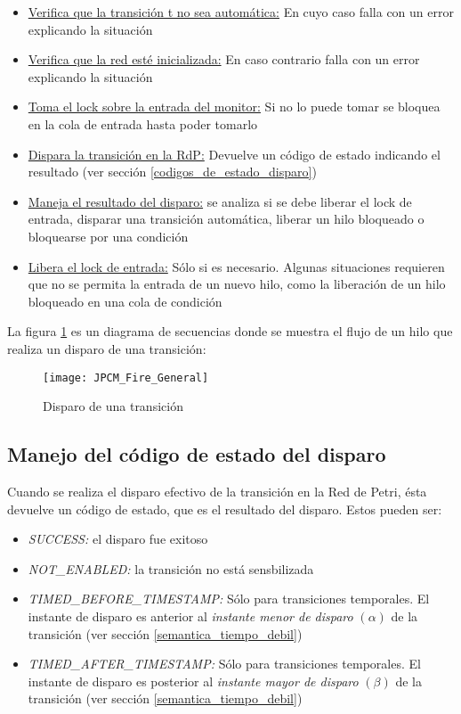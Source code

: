\begin{itemize}
  \item \underline{Verifica que la transición t no sea automática:} En cuyo caso
  falla con un error explicando la situación
  \item \underline{Verifica que la red esté inicializada:} En caso contrario
  falla con un error explicando la situación
  \item \underline{Toma el lock sobre la entrada del monitor:} Si no lo puede
  tomar se bloquea en la cola de entrada hasta poder tomarlo
  \item  \underline{Dispara la transición en la RdP:} Devuelve un código de
  estado indicando el resultado (ver sección \ref{codigos_de_estado_disparo})
  \item \underline{Maneja el resultado del disparo:} se analiza si se debe
  liberar el lock de entrada, disparar una transición automática, liberar un
  hilo bloqueado o bloquearse por una condición
  \item \underline{Libera el lock de entrada:} Sólo si es necesario. Algunas
  situaciones requieren que no se permita la entrada de un nuevo hilo, como la
  liberación de un hilo bloqueado en una cola de condición
\end{itemize}
 
La figura \ref{fig:JPCM_Fire_General} es un diagrama de secuencias donde se
muestra el flujo de un hilo que realiza un disparo de una transición:

\begin{figure}[H]
  \texttt{[image: JPCM\_Fire\_General]}
  \caption{Disparo de una transición}
  \label{fig:JPCM_Fire_General}
\end{figure}

\subsection*{Manejo del código de estado del disparo}
\label{codigos_de_estado_disparo}

Cuando se realiza el disparo efectivo de la transición en la Red de Petri, ésta
devuelve un código de estado, que es el resultado del disparo. Estos pueden
ser:
\begin{itemize}
  \item \textit{SUCCESS:} el disparo fue exitoso
  \item \textit{NOT\_ENABLED:} la transición no está sensbilizada
  \item \textit{TIMED\_BEFORE\_TIMESTAMP:} Sólo para transiciones
  temporales. El instante de disparo es anterior al \textit{instante menor de
  disparo} $(\alpha)$ de la transición (ver sección \ref{semantica_tiempo_debil})
  \item \textit{TIMED\_AFTER\_TIMESTAMP:} Sólo para transiciones
  temporales. El instante de disparo es posterior al \textit{instante mayor de
  disparo} $(\beta)$ de la transición (ver sección \ref{semantica_tiempo_debil})
\end{itemize}

